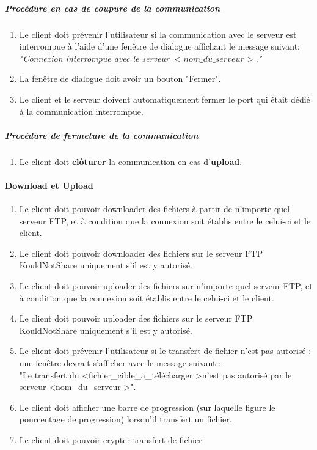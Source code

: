 \documentclass[10pt,a4paper]{report}
\begin{document}
	\subparagraph{Procédure en cas de coupure de la communication}

		\begin{enumerate}
			\item Le client doit prévenir l'utilisateur si la communication avec le serveur est interrompue à l'aide d'une fenêtre de dialogue affichant le message suivant:\\
\textit{"Connexion interrompue avec le serveur $< nom\_du\_serveur>$."}

			\item La fenêtre de dialogue doit avoir un bouton "Fermer".

			\item Le client et le serveur doivent automatiquement fermer le port qui était dédié à la communication interrompue.
		\end{enumerate}
		
	\subparagraph{Procédure de fermeture de la communication}

		\begin{enumerate}
			\item Le client doit \textbf{clôturer} la communication en cas d'\textbf{upload}. 
		\end{enumerate}
		
\paragraph{Download et Upload}

	\begin{enumerate}
		\item Le client doit pouvoir downloader des fichiers à partir de n'importe quel serveur FTP, et à condition que la connexion soit établis entre le celui-ci et le client.
		\item Le client doit pouvoir downloader des fichiers sur le serveur FTP KouldNotShare uniquement s'il est y autorisé.
		\item Le client doit pouvoir uploader des fichiers sur n'importe quel serveur FTP, et à condition que la connexion soit établis entre le celui-ci et le client.
		\item Le client doit pouvoir uploader des fichiers sur le serveur FTP KouldNotShare uniquement s'il est y autorisé.
		\item Le client doit prévenir l'utilisateur si le transfert de fichier n'est pas autorisé : une fenêtre devrait s'afficher avec le message suivant :\\
		 "Le transfert du \textless fichier\_cible\_a\_télécharger \textgreater n'est pas autorisé par le serveur \textless nom\_du\_serveur \textgreater ".
		\item Le client doit afficher une barre de progression (sur laquelle figure le pourcentage de progression) lorsqu'il transfert un fichier.
		\item Le client doit pouvoir crypter transfert de fichier. 
	\end{enumerate}
\end{document}
